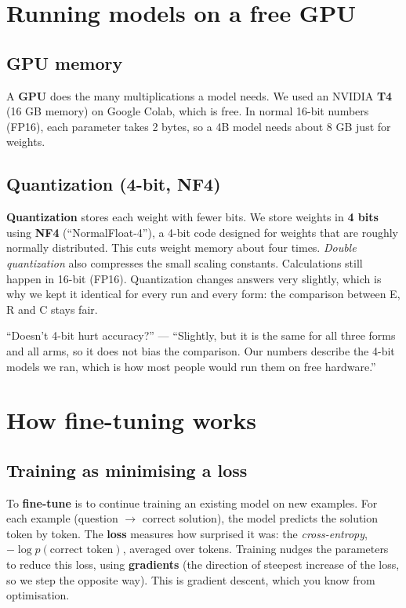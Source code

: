 \documentclass[11pt,a4paper]{article}
\begin{document}
\section{Running models on a free GPU}

\subsection{GPU memory}
A \textbf{GPU} does the many multiplications a model needs. We used an NVIDIA \textbf{T4} (16 GB memory) on Google Colab, which is free. In normal 16-bit numbers (FP16), each parameter takes 2 bytes, so a 4B model needs about 8 GB just for weights.

\subsection{Quantization (4-bit, NF4)}
\textbf{Quantization} stores each weight with fewer bits. We store weights in \textbf{4 bits} using \textbf{NF4} (``NormalFloat-4''), a 4-bit code designed for weights that are roughly normally distributed. This cuts weight memory about four times. \emph{Double quantization} also compresses the small scaling constants. Calculations still happen in 16-bit (FP16). Quantization changes answers very slightly, which is why we kept it identical for every run and every form: the comparison between E, R and C stays fair.

\begin{ifasked}
``Doesn't 4-bit hurt accuracy?'' --- ``Slightly, but it is the same for all three forms and all arms, so it does not bias the comparison. Our numbers describe the 4-bit models we ran, which is how most people would run them on free hardware.''
\end{ifasked}

\section{How fine-tuning works}

\subsection{Training as minimising a loss}
To \textbf{fine-tune} is to continue training an existing model on new examples. For each example (question $\to$ correct solution), the model predicts the solution token by token. The \textbf{loss} measures how surprised it was: the \emph{cross-entropy}, $-\log p(\text{correct token})$, averaged over tokens. Training nudges the parameters to reduce this loss, using \textbf{gradients} (the direction of steepest increase of the loss, so we step the opposite way). This is gradient descent, which you know from optimisation.
\end{document}
